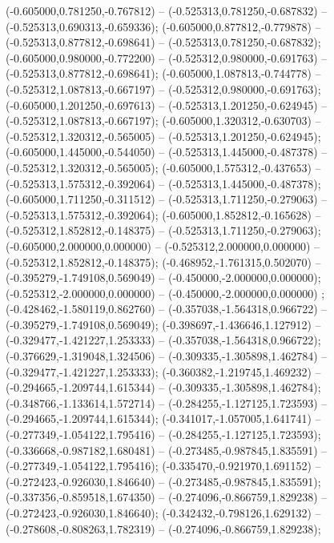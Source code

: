  (-0.605000,0.781250,-0.767812) -- (-0.525313,0.781250,-0.687832) -- (-0.525313,0.690313,-0.659336);
 (-0.605000,0.877812,-0.779878) -- (-0.525313,0.877812,-0.698641) -- (-0.525313,0.781250,-0.687832);
 (-0.605000,0.980000,-0.772200) -- (-0.525312,0.980000,-0.691763) -- (-0.525313,0.877812,-0.698641);
 (-0.605000,1.087813,-0.744778) -- (-0.525312,1.087813,-0.667197) -- (-0.525312,0.980000,-0.691763);
 (-0.605000,1.201250,-0.697613) -- (-0.525313,1.201250,-0.624945) -- (-0.525312,1.087813,-0.667197);
 (-0.605000,1.320312,-0.630703) -- (-0.525312,1.320312,-0.565005) -- (-0.525313,1.201250,-0.624945);
 (-0.605000,1.445000,-0.544050) -- (-0.525313,1.445000,-0.487378) -- (-0.525312,1.320312,-0.565005);
 (-0.605000,1.575312,-0.437653) -- (-0.525313,1.575312,-0.392064) -- (-0.525313,1.445000,-0.487378);
 (-0.605000,1.711250,-0.311512) -- (-0.525313,1.711250,-0.279063) -- (-0.525313,1.575312,-0.392064);
 (-0.605000,1.852812,-0.165628) -- (-0.525312,1.852812,-0.148375) -- (-0.525313,1.711250,-0.279063);
 (-0.605000,2.000000,0.000000) -- (-0.525312,2.000000,0.000000) -- (-0.525312,1.852812,-0.148375);
 (-0.468952,-1.761315,0.502070) -- (-0.395279,-1.749108,0.569049) -- (-0.450000,-2.000000,0.000000);
 (-0.525312,-2.000000,0.000000) -- (-0.450000,-2.000000,0.000000) ;
 (-0.428462,-1.580119,0.862760) -- (-0.357038,-1.564318,0.966722) -- (-0.395279,-1.749108,0.569049);
 (-0.398697,-1.436646,1.127912) -- (-0.329477,-1.421227,1.253333) -- (-0.357038,-1.564318,0.966722);
 (-0.376629,-1.319048,1.324506) -- (-0.309335,-1.305898,1.462784) -- (-0.329477,-1.421227,1.253333);
 (-0.360382,-1.219745,1.469232) -- (-0.294665,-1.209744,1.615344) -- (-0.309335,-1.305898,1.462784);
 (-0.348766,-1.133614,1.572714) -- (-0.284255,-1.127125,1.723593) -- (-0.294665,-1.209744,1.615344);
 (-0.341017,-1.057005,1.641741) -- (-0.277349,-1.054122,1.795416) -- (-0.284255,-1.127125,1.723593);
 (-0.336668,-0.987182,1.680481) -- (-0.273485,-0.987845,1.835591) -- (-0.277349,-1.054122,1.795416);
 (-0.335470,-0.921970,1.691152) -- (-0.272423,-0.926030,1.846640) -- (-0.273485,-0.987845,1.835591);
 (-0.337356,-0.859518,1.674350) -- (-0.274096,-0.866759,1.829238) -- (-0.272423,-0.926030,1.846640);
 (-0.342432,-0.798126,1.629132) -- (-0.278608,-0.808263,1.782319) -- (-0.274096,-0.866759,1.829238);
